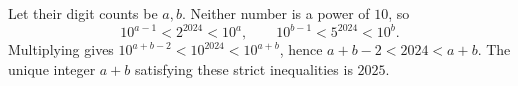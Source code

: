 Let their digit counts be $a,b$. Neither number is a power of $10$, so
\[10^{a-1}<2^{2024}<10^a,\qquad10^{b-1}<5^{2024}<10^b.\]
Multiplying gives $10^{a+b-2}<10^{2024}<10^{a+b}$, hence $a+b-2<2024<a+b$. The unique integer $a+b$ satisfying these strict inequalities is $\boxed{2025}$.
